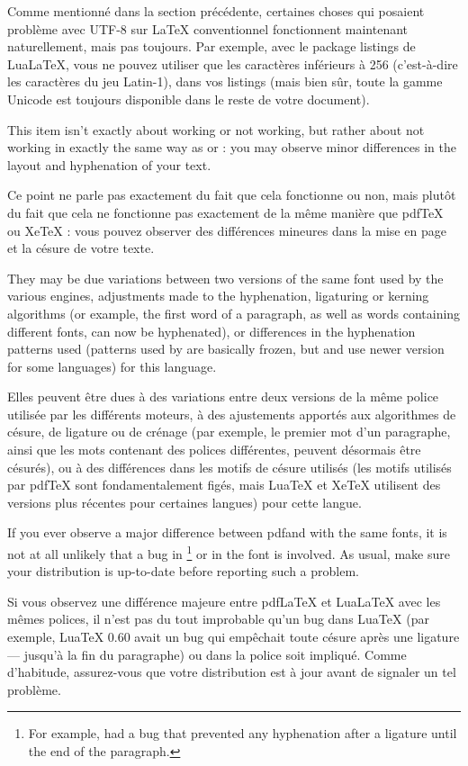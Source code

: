 \documentclass{lltxdoc}
\begin{document}
Comme mentionné dans la section précédente, certaines choses qui posaient problème avec UTF-8 sur LaTeX conventionnel fonctionnent maintenant naturellement, mais pas toujours. Par exemple, avec le package listings de LuaLaTeX, vous ne pouvez utiliser que les caractères inférieurs à 256 (c'est-à-dire les caractères du jeu Latin-1), dans vos listings (mais bien sûr, toute la gamme Unicode est toujours disponible dans le reste de votre document).

This item isn't exactly about working or not working, but rather about not
working in exactly the same way as \pdftex or \xetex: you may observe minor
differences in the layout and hyphenation of your text.

Ce point ne parle pas exactement du fait que cela fonctionne ou non, mais plutôt du fait que cela ne fonctionne pas exactement de la même manière que pdfTeX ou XeTeX : vous pouvez observer des différences mineures dans la mise en page et la césure de votre texte.

They may be due variations between two versions of the same font used by the
various engines, adjustments made to the hyphenation, ligaturing or kerning
algorithms (or example, the first word of a paragraph, as well as words
containing different fonts, can now be hyphenated), or differences in the
hyphenation patterns used (patterns used by \pdftex are basically frozen, but
\luatex and \xetex use newer version for some languages) for this language.

Elles peuvent être dues à des variations entre deux versions de la même police utilisée par les différents moteurs, à des ajustements apportés aux algorithmes de césure, de ligature ou de crénage (par exemple, le premier mot d'un paragraphe, ainsi que les mots contenant des polices différentes, peuvent désormais être césurés), ou à des différences dans les motifs de césure utilisés (les motifs utilisés par pdfTeX sont fondamentalement figés, mais LuaTeX et XeTeX utilisent des versions plus récentes pour certaines langues) pour cette langue.

If you ever observe a major difference between pdf\latex and \lualatex with
the same fonts, it is not at all unlikely that a bug in \luatex\footnote{For
  example,  had a bug that prevented any hyphenation after a
  \code{-{}-{}-} ligature until the end of the paragraph.} or in the font is
involved. As usual, make sure your distribution is up-to-date before reporting
such a problem.

Si vous observez une différence majeure entre pdfLaTeX et LuaLaTeX avec les mêmes polices, il n'est pas du tout improbable qu'un bug dans LuaTeX (par exemple, LuaTeX 0.60 avait un bug qui empêchait toute césure après une ligature --- jusqu'à la fin du paragraphe) ou dans la police soit impliqué. Comme d'habitude, assurez-vous que votre distribution est à jour avant de signaler un tel problème.
\end{document}
